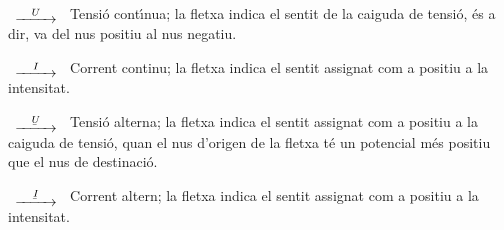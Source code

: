 \begin{list}{}
{\setlength{\labelwidth}{15mm} \setlength{\leftmargin}{25mm}
\setlength{\labelsep}{10mm}}
    \item[$\begin{CD} @>U>> \end{CD}$] Tensi\'{o} cont\'{\i}nua; la fletxa indica el sentit
    de la caiguda de tensi\'{o}, \'{e}s a dir, va del nus positiu al nus negatiu.
    \item[$\begin{CD} @>I>> \end{CD}$] Corrent
    continu; la fletxa indica el sentit  assignat com a positiu a la
    intensitat.
    \item[$\begin{CD} @>\cmplx{U}>> \end{CD}$] Tensi\'{o} alterna; la fletxa indica el
    sentit assignat com a positiu a la caiguda de tensi\'{o}, quan el nus d'origen de la fletxa
    t\'{e} un potencial  m\'{e}s positiu que el nus de destinaci\'{o}.
    \item[$\begin{CD} @>\cmplx{I}>> \end{CD}$] Corrent altern; la fletxa
    indica el sentit  assignat com a positiu a la
    intensitat.
\end{list}
